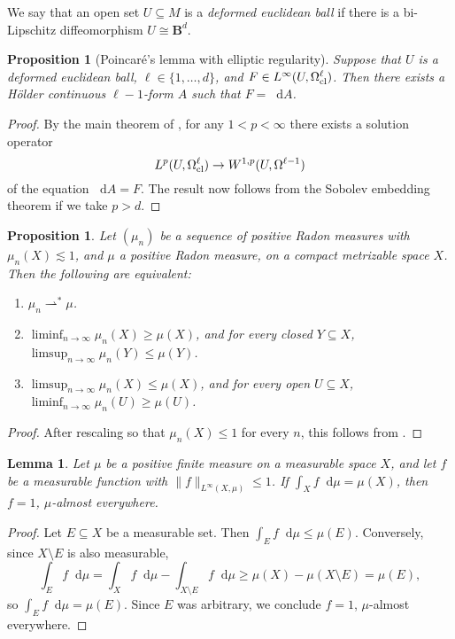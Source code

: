 \documentclass[reqno,11pt]{amsart}
\newcommand{\Ball}{\mathbf{B}}
\newcommand*\dif{\mathop{}\!\mathrm{d}}
\newcommand{\weakto}{\rightharpoonup}
\newcommand{\dfn}[1]{\emph{#1}\index{#1}}
\newtheorem{lemma}[theorem]{Lemma}
\newtheorem{proposition}[theorem]{Proposition}
\theoremstyle{definition}
\numberwithin{equation}{section}
\begin{document}
We say that an open set $U \subseteq M$ is a \dfn{deformed euclidean ball} if there is a bi-Lipschitz diffeomorphism $U \cong \Ball^d$.

\begin{proposition}[Poincar\'e's lemma with elliptic regularity]\label{Hodge theorem}
Suppose that $U$ is a deformed euclidean ball, $\ell \in \{1, \dots, d\}$, and $F \in L^\infty(U, \Omega^\ell_{\rm cl})$.
Then there exists a H\"older continuous $\ell - 1$-form $A$ such that $F = \dif A$.
\end{proposition}
\begin{proof}
By the main theorem of \cite{Costabel2010}, for any $1 < p < \infty$ there exists a solution operator 
$$L^p(U, \Omega^\ell_{\rm cl}) \to W^{1, p}(U, \Omega^{\ell - 1})$$
of the equation $\dif A = F$.
The result now follows from the Sobolev embedding theorem if we take $p > d$.
\end{proof}

\begin{proposition}\label{portmanteau}
Let $(\mu_n)$ be a sequence of positive Radon measures with $\mu_n(X) \lesssim 1$, and $\mu$ a positive Radon measure, on a compact metrizable space $X$.
Then the following are equivalent:
\begin{enumerate}
\item $\mu_n \weakto^* \mu$.
\item $\liminf_{n \to \infty} \mu_n(X) \geq \mu(X)$, and for every closed $Y \subseteq X$, $\limsup_{n \to \infty} \mu_n(Y) \leq \mu(Y)$.
\item $\limsup_{n \to \infty} \mu_n(X) \leq \mu(X)$, and for every open $U \subseteq X$, $\liminf_{n \to \infty} \mu_n(U) \geq \mu(U)$.
\end{enumerate}
\end{proposition}
\begin{proof}
After rescaling so that $\mu_n(X) \leq 1$ for every $n$, this follows from \cite[Theorem 13.16]{klenke2013probability}.
\end{proof}

\begin{lemma}\label{measurable function is 1}
Let $\mu$ be a positive finite measure on a measurable space $X$, and let $f$ be a measurable function with $\|f\|_{L^\infty(X, \mu)} \leq 1$.
If $\int_X f \dif \mu = \mu(X)$, then $f = 1$, $\mu$-almost everywhere.
\end{lemma}
\begin{proof}
Let $E \subseteq X$ be a measurable set.
Then $\int_E f \dif \mu \leq \mu(E)$.
Conversely, since $X \setminus E$ is also measurable,
$$\int_E f \dif \mu = \int_X f \dif \mu - \int_{X \setminus E} f \dif \mu \geq \mu(X) - \mu(X \setminus E) = \mu(E),$$
so $\int_E f \dif \mu = \mu(E)$.
Since $E$ was arbitrary, we conclude $f = 1$, $\mu$-almost everywhere.
\end{proof}
\end{document}
